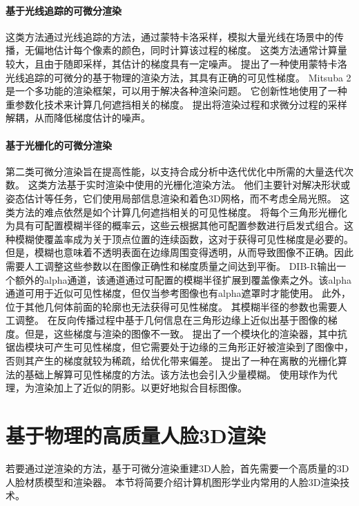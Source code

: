 \paragraph{基于光线追踪的可微分渲染}
这类方法通过光线追踪的方法，通过蒙特卡洛采样，模拟大量光线在场景中的传播，无偏地估计每个像素的颜色，同时计算该过程的梯度。
这类方法通常计算量较大，且由于随即采样，其估计的梯度具有一定噪声。
\citet{redner}提出了一种使用蒙特卡洛光线追踪的可微分的基于物理的渲染方法，其具有正确的可见性梯度。
Mitsuba 2\citep{Mitsuba2}是一个多功能的渲染框架，可以用于解决各种渲染问题。
它创新性地使用了一种重参数化技术来计算几何遮挡相关的梯度。
\citet{ZeltnerSGJ21}提出将渲染过程和求微分过程的采样解耦，从而降低梯度估计的噪声。

\paragraph{基于光栅化的可微分渲染}
第二类可微分渲染旨在提高性能，以支持合成分析中迭代优化中所需的大量迭代次数。
这类方法基于实时渲染中使用的光栅化渲染方法。
他们主要针对解决形状或姿态估计等任务，它们使用局部信息渲染和着色3D网格，而不考虑全局光照。
这类方法的难点依然是如个计算几何遮挡相关的可见性梯度。
\citet{softras}将每个三角形光栅化为具有可配置模糊半径的概率云，这些云根据其他可配置参数进行启发式组合。这种模糊使覆盖率成为关于顶点位置的连续函数，这对于获得可见性梯度是必要的。
但是，模糊也意味着不透明表面在边缘周围变得透明，从而导致图像不正确。因此需要人工调整这些参数以在图像正确性和梯度质量之间达到平衡。
DIB-R\citep{ChenLGSLJF19}输出一个额外的alpha通道，该通道通过可配置的模糊半径扩展到覆盖像素之外。该alpha通道可用于近似可见性梯度，但仅当参考图像也有alpha遮罩时才能使用。
此外，位于其他几何体前面的轮廓也无法获得可见性梯度。
其模糊半径的参数也需要人工调整。
\citet{KatoUH18}在反向传播过程中基于几何信息在三角形边缘上近似出基于图像的梯度。但是，这些梯度与渲染的图像不一致。
\citet{nvdiffrast}提出了一个模块化的渲染器，其中抗锯齿模块可产生可见性梯度，但它需要处于边缘的三角形正好被渲染到了图像中，否则其产生的梯度就较为稀疏，给优化带来偏差。
\citet{ColeGSVZ21}提出了一种在离散的光栅化算法的基础上解算可见性梯度的方法。该方法也会引入少量模糊。
\citet{LyuHL0TT21}使用球作为代理，为渲染加上了近似的阴影。以更好地拟合目标图像。

\section{基于物理的高质量人脸3D渲染}

若要通过逆渲染的方法，基于可微分渲染重建3D人脸，首先需要一个高质量的3D人脸材质模型和渲染器。
本节将简要介绍计算机图形学业内常用的人脸3D渲染技术。

